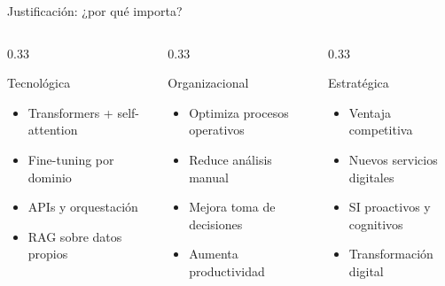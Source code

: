 \documentclass[10pt,aspectratio=169]{beamer}
\begin{document}
\begin{frame}{Justificación: ¿por qué importa?}
    \begin{columns}[T]
        \begin{column}{0.33\textwidth}
            \begin{block}{Tecnológica}
                \begin{itemize}
                    \item Transformers + self-attention
                    \item Fine-tuning por dominio
                    \item APIs y orquestación
                    \item RAG sobre datos propios
                \end{itemize}
            \end{block}
        \end{column}
        \begin{column}{0.33\textwidth}
            \begin{block}{Organizacional}
                \begin{itemize}
                    \item Optimiza procesos operativos
                    \item Reduce análisis manual
                    \item Mejora toma de decisiones
                    \item Aumenta productividad
                \end{itemize}
            \end{block}
        \end{column}
        \begin{column}{0.33\textwidth}
            \begin{block}{Estratégica}
                \begin{itemize}
                    \item Ventaja competitiva
                    \item Nuevos servicios digitales
                    \item SI proactivos y cognitivos
                    \item Transformación digital
                \end{itemize}
            \end{block}
        \end{column}
    \end{columns}
\end{frame}
\end{document}
